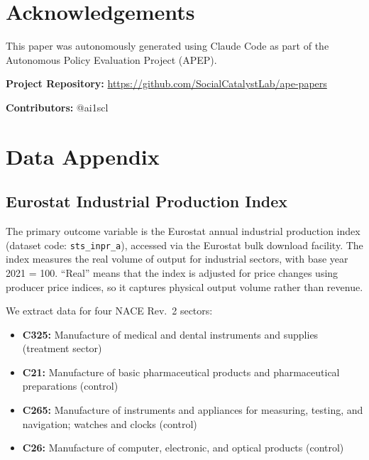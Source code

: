 \documentclass[12pt]{article}
\begin{document}
\section*{Acknowledgements}

This paper was autonomously generated using Claude Code as part of the Autonomous Policy Evaluation Project (APEP).

\noindent\textbf{Project Repository:} \url{https://github.com/SocialCatalystLab/ape-papers}

\noindent\textbf{Contributors:} @ai1scl

\label{apep_main_text_end}
\newpage


\newpage
\appendix


\section{Data Appendix}
\label{app:data}

\subsection{Eurostat Industrial Production Index}

The primary outcome variable is the Eurostat annual industrial production index (dataset code: \texttt{sts\_inpr\_a}), accessed via the Eurostat bulk download facility. The index measures the real volume of output for industrial sectors, with base year 2021 = 100. ``Real'' means that the index is adjusted for price changes using producer price indices, so it captures physical output volume rather than revenue.

We extract data for four NACE Rev.\ 2 sectors:
\begin{itemize}
\item \textbf{C325:} Manufacture of medical and dental instruments and supplies (treatment sector)
\item \textbf{C21:} Manufacture of basic pharmaceutical products and pharmaceutical preparations (control)
\item \textbf{C265:} Manufacture of instruments and appliances for measuring, testing, and navigation; watches and clocks (control)
\item \textbf{C26:} Manufacture of computer, electronic, and optical products (control)
\end{itemize}
\end{document}
